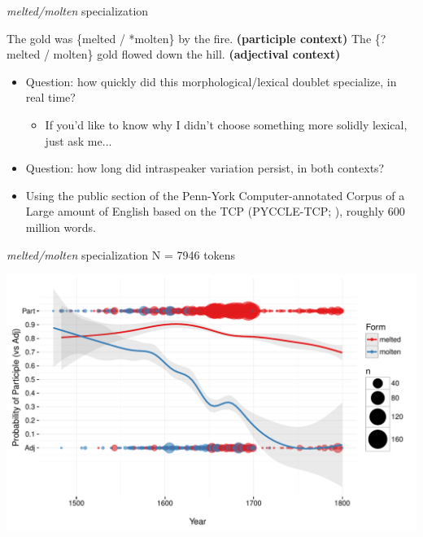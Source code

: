 \documentclass[hyperref={pdfpagelabels=false}]{beamer}
\begin{document}
\begin{frame}{\textsl{melted/molten} specialization}
\begin{exe}
	\ex The gold was \{melted / *molten\} by the fire. \textbf{(participle context)}
	\ex The \{?melted / molten\} gold flowed down the hill. \textbf{(adjectival context)}
\end{exe}
\begin{itemize}
\item Question: how quickly did this morphological/lexical doublet specialize, in real time?
\begin{itemize}
	\item If you'd like to know why I didn't choose something more solidly lexical, just ask me...
\end{itemize}
\item Question: how long did intraspeaker variation persist, in both contexts?
\item Using the public section of the {P}enn-{Y}ork {C}omputer-annotated {C}orpus of a {L}arge amount of {E}nglish based on the {TCP (PYCCLE-TCP; \citealt{pyccle})}, roughly 600 million words.
\end{itemize}
\end{frame}


\begin{frame}{\textsl{melted/molten} specialization N =  7946 tokens}

\includegraphics[width=1.128\textwidth]{ContextByDateUnbinnedWithDots2.pdf}
\end{frame}
\end{document}
